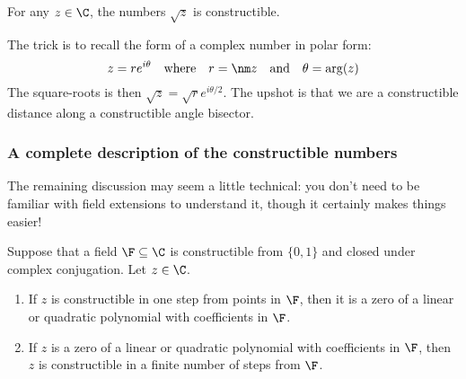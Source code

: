 \begin{cor}\label{cor:const-root}
For any $z\in\C$, the numbers $\sqrt z$ is constructible.
\end{cor}

The trick is to recall the form of a complex number in polar form:
\[z=re^{i\theta}\quad\text{where}\quad r=\nm z\quad\text{and}\quad \theta=\arg(z)\]
The square-roots is then $\sqrt z=\sqrt re^{i\theta/2}$. The upshot is that we are a constructible distance along a constructible angle bisector.



\subsubsection*{A complete description of the constructible numbers}

The remaining discussion may seem a little technical: you don't need to be familiar with field extensions to understand it, though it certainly makes things easier!

\begin{thm}
Suppose that a field $\F\subseteq\C$ is constructible from $\{0,1\}$ and closed under complex conjugation. Let $z\in\C$.
\begin{enumerate}
  \item If $z$ is constructible in one step from points in $\F$, then it is a zero of a linear or quadratic polynomial with coefficients in $\F$.
  \item If $z$ is a zero of a linear or quadratic polynomial with coefficients in $\F$, then $z$ is constructible in a finite number of steps from $\F$.
\end{enumerate}
\end{thm}

